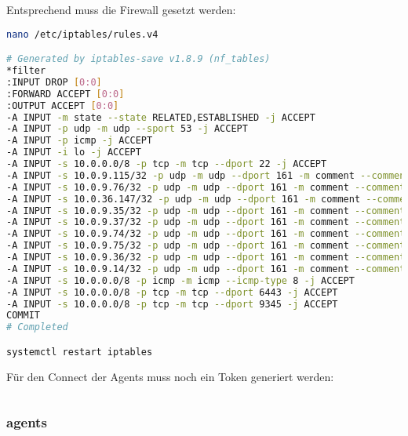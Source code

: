Entsprechend muss die Firewall gesetzt werden:
\lstset{style=gra_codestyle}
\begin{lstlisting}[language=bash, caption=iptables entries server,captionpos=b,label={lst:iptables-server-entries},breaklines=true]
nano /etc/iptables/rules.v4

# Generated by iptables-save v1.8.9 (nf_tables)
*filter
:INPUT DROP [0:0]
:FORWARD ACCEPT [0:0]
:OUTPUT ACCEPT [0:0]
-A INPUT -m state --state RELATED,ESTABLISHED -j ACCEPT
-A INPUT -p udp -m udp --sport 53 -j ACCEPT
-A INPUT -p icmp -j ACCEPT
-A INPUT -i lo -j ACCEPT
-A INPUT -s 10.0.0.0/8 -p tcp -m tcp --dport 22 -j ACCEPT
-A INPUT -s 10.0.9.115/32 -p udp -m udp --dport 161 -m comment --comment "Allow SNMP for probe 10.0.9.115" -j ACCEPT
-A INPUT -s 10.0.9.76/32 -p udp -m udp --dport 161 -m comment --comment "Allow SNMP for probe 10.0.9.76" -j ACCEPT
-A INPUT -s 10.0.36.147/32 -p udp -m udp --dport 161 -m comment --comment "Allow SNMP for probe 10.0.36.147" -j ACCEPT
-A INPUT -s 10.0.9.35/32 -p udp -m udp --dport 161 -m comment --comment "Allow SNMP for probe 10.0.9.35" -j ACCEPT
-A INPUT -s 10.0.9.37/32 -p udp -m udp --dport 161 -m comment --comment "Allow SNMP for probe 10.0.9.37" -j ACCEPT
-A INPUT -s 10.0.9.74/32 -p udp -m udp --dport 161 -m comment --comment "Allow SNMP for probe 10.0.9.74" -j ACCEPT
-A INPUT -s 10.0.9.75/32 -p udp -m udp --dport 161 -m comment --comment "Allow SNMP for probe 10.0.9.75" -j ACCEPT
-A INPUT -s 10.0.9.36/32 -p udp -m udp --dport 161 -m comment --comment "Allow SNMP for probe 10.0.9.36" -j ACCEPT
-A INPUT -s 10.0.9.14/32 -p udp -m udp --dport 161 -m comment --comment "Allow SNMP for probe 10.0.9.14" -j ACCEPT
-A INPUT -s 10.0.0.0/8 -p icmp -m icmp --icmp-type 8 -j ACCEPT
-A INPUT -s 10.0.0.0/8 -p tcp -m tcp --dport 6443 -j ACCEPT
-A INPUT -s 10.0.0.0/8 -p tcp -m tcp --dport 9345 -j ACCEPT
COMMIT
# Completed

systemctl restart iptables
\end{lstlisting}

Für den Connect der Agents muss noch ein Token generiert werden:
\begin{lstlisting}[language=bash, caption=rke2 server token,captionpos=b,label={lst:rke2-server-token},breaklines=true]
\end{lstlisting}

\subsubsection{agents}

